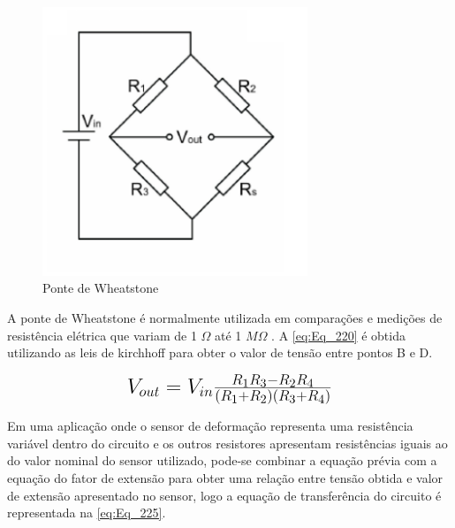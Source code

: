 \begin{figure}[htb]
	\caption{\label{fig:1090} Ponte de Wheatstone}
	\begin{center}
		\includegraphics[width=300]{pictures/1090.png}
	\end{center}
\end{figure}

A ponte de Wheatstone é normalmente utilizada em comparações e medições de resistência elétrica que variam de 1 $\Omega$ até 1 $M\Omega$ \autocite{Hollman2011}.
A \autoref{eq:Eq_220} é obtida utilizando as leis de kirchhoff para obter o valor de tensão entre pontos B e D.

\begin{equation}\label{eq:Eq_220}%
\mbox{\fontsize{17.28}{21.6}\selectfont\( %
V_{out} = V_{in} \frac{R_1 R_3 - R_2 R_4}{(R_1 + R_2)(R_3 + R_4)}
\)} %
\end{equation}

%
%
%

\hfill

Em uma aplicação onde o sensor de deformação representa uma resistência variável dentro do circuito e os outros resistores apresentam resistências
iguais ao do valor nominal do sensor utilizado, pode-se combinar a equação prévia com a equação do fator de extensão para obter uma relação entre tensão obtida
e valor de extensão apresentado no sensor, logo a equação de transferência do circuito é representada na \autoref{eq:Eq_225}.

